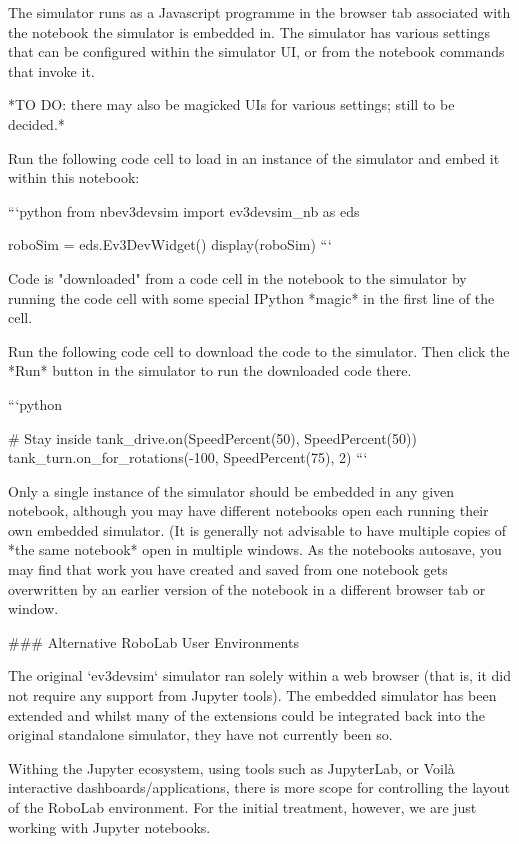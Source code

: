 \documentclass[letterpaper,10pt,english]{sphinxmanual}
\begin{document}
The simulator runs as a Javascript programme in the browser tab associated with the notebook the simulator is embedded in. The simulator has various settings that can be configured within the simulator UI, or from the notebook commands that invoke it.

*TO DO: there may also be magicked UIs for various settings; still to be decided.*


Run the following code cell to load in an instance of the simulator and embed it within this notebook:

```python
from nbev3devsim import ev3devsim_nb as eds

roboSim = eds.Ev3DevWidget()
display(roboSim)
```

Code is "downloaded" from a code cell in the notebook to the simulator by running the code cell with some special IPython *magic* in the first line of the cell.

Run the following code cell to download the code to the simulator. Then click the *Run* button in the simulator to run the downloaded code there.

```python

# Stay inside
tank_drive.on(SpeedPercent(50), SpeedPercent(50))
tank_turn.on_for_rotations(-100, SpeedPercent(75), 2)
```

Only a single instance of the simulator should be embedded in any given notebook, although you may have different notebooks open each running their own embedded simulator. (It is generally not advisable to have multiple copies of *the same notebook* open in multiple windows. As the notebooks autosave, you may find that work you have created and saved from one notebook gets overwritten by an earlier version of the notebook in a different browser tab or window.


### Alternative RoboLab User Environments

The original `ev3devsim` simulator ran solely within a web browser (that is, it did not require any support from Jupyter tools). The embedded simulator has been extended and whilst many of the extensions could be integrated back into the original standalone simulator, they have not currently been so.

Withing the Jupyter ecosystem, using tools such as JupyterLab, or Voilà interactive dashboards/applications, there is more scope for controlling the layout of the RoboLab environment. For the initial treatment, however, we are just working with Jupyter notebooks.
\end{document}
